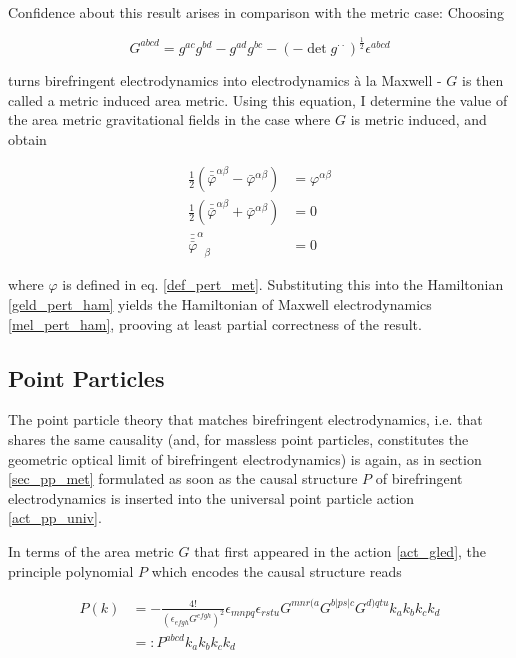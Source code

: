 \documentclass[11pt]{article}
\begin{document}
Confidence about this result arises in comparison with the metric case: Choosing

\begin{equation}
	G^{a b c d} = 
	g^{a c} g^{b d} - g^{a d}g^{b c} 
	- \left(
	-\det{g^{\cdot \cdot}}
	\right) ^{\frac{1}{2}}
	\epsilon^{ a b c d}
\end{equation}

turns birefringent electrodynamics into electrodynamics à la Maxwell - $G$ is then called a metric induced area metric. Using this equation, I determine the value of the area metric gravitational fields in the case where $G$ is metric induced, and obtain

\begin{align}
	\frac{1}{2} 
	\left( 
	\bar{\bar{\varphi}}^{\alpha \beta} 
	- \bar{\varphi}^{\alpha \beta}
	\right) 
	&= \varphi^{\alpha \beta}\\
	\frac{1}{2} 
	\left( 
	\bar{\bar{\varphi}}^{\alpha \beta} 
	+ \bar{\varphi}^{\alpha \beta}
	\right) 
	&= 0 \\
	{\bar{\bar{\bar{\varphi}}}^\alpha}_\beta 
	&= 0
\end{align}

where $\varphi$ is defined in eq. \ref{def_pert_met}. Substituting this into the Hamiltonian \ref{geld_pert_ham} yields the Hamiltonian of Maxwell electrodynamics \ref{mel_pert_ham}, prooving at least partial correctness of the result.

\subsection{Point Particles} \label{sec_pp_am}

The point particle theory that matches birefringent electrodynamics, i.e. that shares the same causality (and, for massless point particles, constitutes the geometric optical limit of birefringent electrodynamics) is again, as in section \ref{sec_pp_met} formulated as soon as the causal structure $P$ of birefringent electrodynamics is inserted into the universal point particle action \ref{act_pp_univ}.

In terms of the area metric $G$ that first appeared in the action \ref{act_gled}, the principle polynomial $P$ which encodes the causal structure reads

\begin{equation}
\begin{split}
	P \left( k \right)
	&= 
	- \frac{4 !}{\left( \epsilon_{e f g h} G^{e f g h }\right)^2}
	\epsilon_{m n p q}
	\epsilon_{r s t u}
	G^{m n r ( a}
	G^{b | p s | c}
	G^{d ) q t u }
	k_a k_b k_c k_d\\
	&=: P^{a b c d} k_a k_b k_c k_d
\end{split}	
\end{equation}
\end{document}
